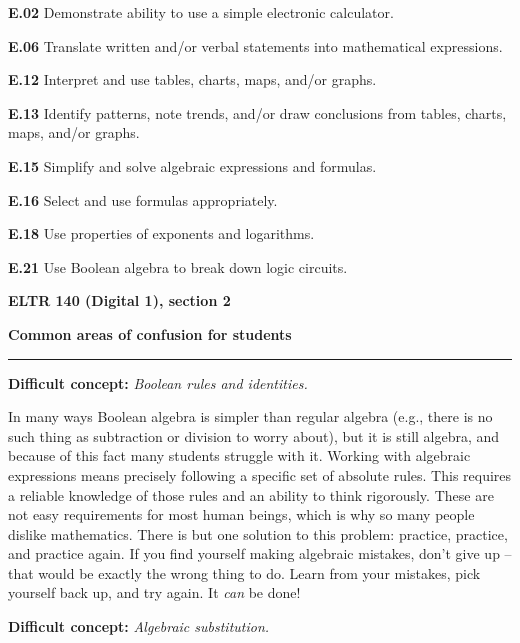 \item{\bf E.02} Demonstrate ability to use a simple electronic calculator.
\item{\bf E.06} Translate written and/or verbal statements into mathematical expressions.
\item{\bf E.12} Interpret and use tables, charts, maps, and/or graphs.
\item{\bf E.13} Identify patterns, note trends, and/or draw conclusions from tables, charts, maps, and/or graphs.
\item{\bf E.15} Simplify and solve algebraic expressions and formulas.
\item{\bf E.16} Select and use formulas appropriately.
\item{\bf E.18} Use properties of exponents and logarithms.
\item{\bf E.21} Use Boolean algebra to break down logic circuits.
\medskip





\vfil \eject

\centerline{\bf ELTR 140 (Digital 1), section 2} \bigskip 
 
\vskip 10pt

\noindent
{\bf Common areas of confusion for students}

\vskip 5pt

\hrule \vskip 5pt

\vskip 10pt

\noindent
{\bf Difficult concept: } {\it Boolean rules and identities.}

In many ways Boolean algebra is simpler than regular algebra (e.g., there is no such thing as subtraction or division to worry about), but it is still algebra, and because of this fact many students struggle with it.  Working with algebraic expressions means precisely following a specific set of absolute rules.  This requires a reliable knowledge of those rules and an ability to think rigorously.  These are not easy requirements for most human beings, which is why so many people dislike mathematics.  There is but one solution to this problem: practice, practice, and practice again.  If you find yourself making algebraic mistakes, don't give up -- that would be exactly the wrong thing to do.  Learn from your mistakes, pick yourself back up, and try again.  It {\it can} be done!

\vskip 10pt

\noindent
{\bf Difficult concept: } {\it Algebraic substitution.}

